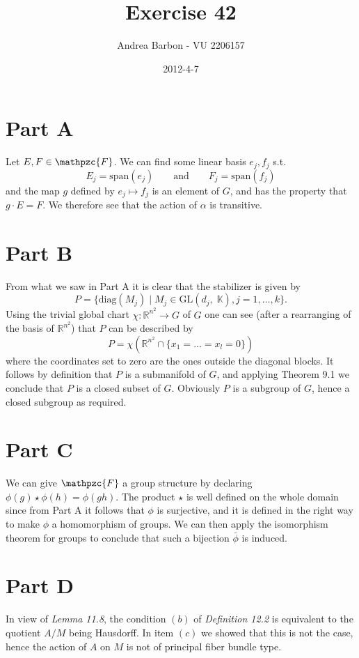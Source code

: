 \documentclass[]{article}
\title{Exercise 42}
\author{ Andrea Barbon - VU 2206157 }
\date{2012-4-7}
\newcommand{\AND}{\qquad \text{and} \qquad}
\begin{document}
\ifpdf
{}
\else
{}
\fi

\maketitle

\section{Part A}
Let $E,F \in \mathpzc{F} $. We can find some linear basis $e_j,f_j$ s.t. 
$$ E_j = \text{span}(e_j) \AND F_j = \text{span}(f_j) $$
and the map $ g $ defined by $e_j \mapsto f_j$ is an element of $G$, and has the property that $ g\cdot E=F $. We therefore see that the action of $\alpha$ is transitive.

\section{Part B}
From what we saw in Part A it is clear that the stabilizer is given by $$ P=\{ \text{diag}(M_j) \mid M_j \in \text{GL}(d_j,\;\mathbb{K}), j=1,\dots,k \}. $$
Using the trivial global chart $\chi:\mathbb{R}^{n^2}\to G$ of $G$ one can see (after a rearranging of the basis of $\mathbb{R}^{n^2}$) that $P$ can be described by $$ P=\chi(\mathbb{R}^{n^2} \cap \{x_1=\dots=x_l=0\}) $$ where the coordinates set to zero are the ones outside the diagonal blocks. It follows by definition that $P$ is a submanifold of $G$, and applying Theorem 9.1 we conclude that $P$ is a closed subset of $G$. Obviously $P$ is a subgroup of $G$, hence a closed subgroup as required.


\section{Part C}
We can give $\mathpzc{F}$ a group structure by declaring $ \phi(g) \star \phi(h) = \phi(gh) $. The product $\star$ is well defined on the whole domain since from Part A it follows that $\phi$ is surjective, and it is defined in the right way to make $\phi$ a homomorphism of groups. We can then apply the isomorphism theorem for groups to conclude that such a bijection $\bar{\phi}$ is induced. 


\section{Part D}

In view of \emph{Lemma 11.8}, the condition $(b)$ of \emph{Definition 12.2} is equivalent to the quotient $A / M$ being Hausdorff. In item $(c)$ we showed that this is not the case, hence the action of $A$ on $M$ is not of principal fiber bundle type. 
\end{document}
